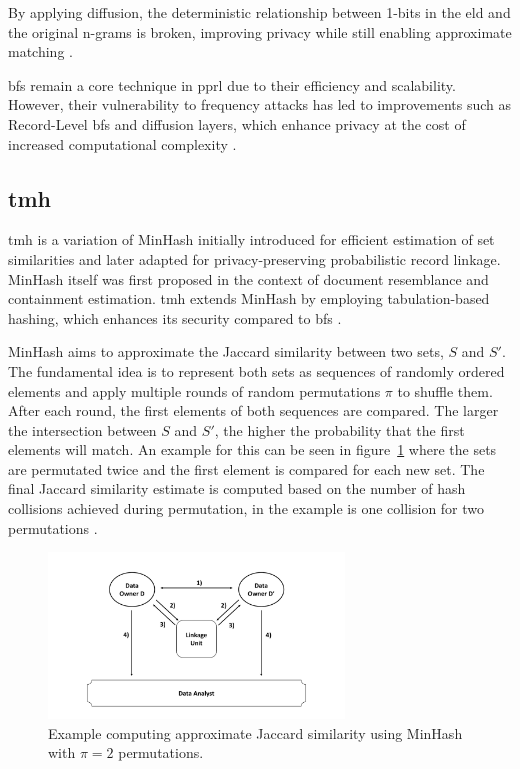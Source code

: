 By applying diffusion, the deterministic relationship between 1-bits in the \ac{eld} and the original n-grams is broken, improving privacy while still enabling approximate matching \cite{armknecht2023strengthening}.

\ac{bf}s remain a core technique in \ac{pprl} due to their efficiency and scalability.
However, their vulnerability to frequency attacks has led to improvements such as Record-Level \ac{bf}s and diffusion layers, which enhance privacy at the cost of increased computational complexity \cite{schaefer2024, vidanage2020graph,armknecht2023strengthening}.


\subsection{\ac{tmh}} \label{sec:tmh}

\ac{tmh} is a variation of MinHash initially introduced for efficient estimation of set similarities and later adapted for privacy-preserving probabilistic record linkage.
MinHash itself was first proposed in the context of document resemblance and containment estimation.
\ac{tmh} extends MinHash by employing tabulation-based hashing, which enhances its security compared to \ac{bf}s \cite{vidanage2020graph,broder1997resemblance}.

MinHash aims to approximate the Jaccard similarity between two sets, \(S\) and \(S'\).
The fundamental idea is to represent both sets as sequences of randomly ordered elements and apply multiple rounds of random permutations \(\pi\) to shuffle them.
After each round, the first elements of both sequences are compared.
The larger the intersection between \(S\) and \(S'\), the higher the probability that the first elements will match.
An example for this can be seen in figure~\ref{fig:minhashexample} where the sets are permutated twice and the first element is compared for each new set.
The final Jaccard similarity estimate is computed based on the number of hash collisions achieved during permutation, in the example is one collision for two permutations \cite{schaefer2024,broder1997resemblance,vidanage2020graph}.

\begin{figure}[H]
  \centering
  \includegraphics[width=0.7\textwidth, page=6]{img/visualization.pdf}
  \caption{Example computing approximate Jaccard similarity using MinHash with \(\pi = 2\) permutations.}
  \label{fig:minhashexample}
\end{figure}

